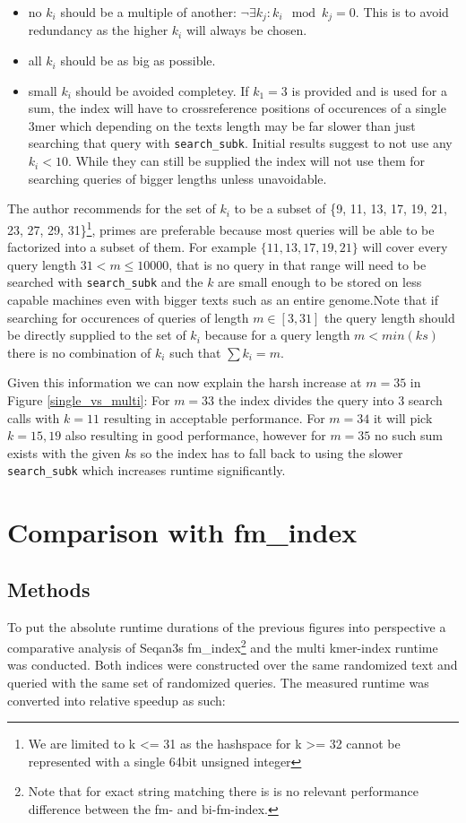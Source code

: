 \begin{itemize}
\item no $k_{i}$ should be a multiple of another: $\lnot\exists k_{j}:k_{i}\mod k_{j}=0$.
This is to avoid redundancy as the higher $k_{i}$ will always be chosen.
\item all $k_{i}$ should be as big as possible.
\item small $k_{i}$ should be avoided completey. If $k_{1}=3$ is provided
and is used for a sum, the index will have to crossreference positions of occurences of a single
3mer which depending on the texts length may be far slower
than just searching that query with \lstinline{search_subk}. Initial
results suggest to not use any $k_{i}<10$. While they can still be supplied
the index will not use them for searching queries of bigger lengths unless unavoidable.
\end{itemize}
The author recommends for the set of $k_{i}$ to be a subset of \{9,
11, 13, 17, 19, 21, 23, 27, 29, 31\}\footnote{We are limited to k <= 31 as the hashspace for k >= 32 cannot be represented with a single 64bit unsigned integer}, primes are preferable because
most queries will be able to be factorized into a subset of them.
For example $\{11,13,17,19,21\}$ will cover every query length $31<m\leq10000$, that is no
query in that range will need to be searched with \lstinline{search_subk}
and the $k$ are small enough to be stored on less capable machines
even with bigger texts such as an entire genome.\newline Note that if searching
for occurences of queries of length $m\in[3,31]$ the query length
should be directly supplied to the set of $k_{i}$ because for a query length $m < min(ks)$
there is no combination of $k_{i}$ such that $\sum k_{i} = m$.

Given this information we can now explain the harsh increase at $m=35$ in Figure \ref{single_vs_multi}: For $m=33$ the index
divides the query into 3 search calls with $k=11$ resulting in acceptable performance. For $m=34$ it will pick $k=15, 19$ also resulting in good performance,
however for $m=35$ no such sum exists with the given $k$s so the index has to fall back to using the slower \lstinline{search_subk}
which increases runtime significantly.

\section{Comparison with fm\_index}
\subsection{Methods}
To put the absolute runtime durations of the previous figures into perspective a comparative analysis
of Seqan3s fm\_index\footnote{Note that for exact string matching there is is no relevant performance
difference between the fm- and bi-fm-index.} and the multi kmer-index runtime was conducted. Both indices were
constructed over the same randomized text and queried with the same set of randomized queries. \newpage
The measured runtime was converted into relative speedup as such:

